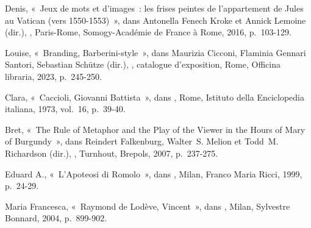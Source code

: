 \begin{teiElement}[name={TEI},change={commons\_edition}]
\begin{teiElement}[name={text},type={book},xmlid={book}]
\begin{teiElement}[name={group},type={book},xmlid={book-001}]
\begin{teiElement}[name={group},type={bibliography},data-page-title={Sources et bibliographie},data-include-href={Ch14\_Source\_bibliographie.xml},xmlid={bibliography-001}]
\begin{teiElement}[name={body}]
\begin{teiDiv}[type={section1},xmlid={div18}]
\begin{teiDiv}[type={section2},xmlid={div19}]
\begin{teiBibl}[xmlid={bibl-407}]
 Denis, « Jeux de mots et d’images : les frises peintes de l’appartement de Jules  au Vatican (vers 1550-1553) », dans Antonella Fenech Kroke et Annick Lemoine (dir.), , Paris-Rome, Somogy-Académie de France à Rome, 2016, p. 103-129.
\end{teiBibl}
              \begin{teiBibl}[xmlid={bibl-408}]
 Louise, « Branding, Barberini-style », dans Maurizia Cicconi, Flaminia Gennari Santori, Sebastian Schütze (dir.), , catalogue d’exposition, Rome, Officina libraria, 2023, p. 245-250.
\end{teiBibl}
              \begin{teiBibl}[xmlid={bibl-409}]
 Clara, « Caccioli, Giovanni Battista », dans , Rome, Istituto della Enciclopedia italiana, 1973, vol. 16, p. 39-40.
\end{teiBibl}
              \begin{teiBibl}[xmlid={bibl-410}]
 Bret, « The Rule of Metaphor and the Play of the Viewer in the Hours of Mary of Burgundy », dans Reindert Falkenburg, Walter S. Melion et Todd M. Richardson (dir.), , Turnhout, Brepols, 2007, p. 237-275.
\end{teiBibl}
              \begin{teiBibl}[xmlid={bibl-411}]
 Eduard A., « L’Apoteosi di Romolo », dans , Milan, Franco Maria Ricci, 1999, p. 24-29. 
\end{teiBibl}
              \begin{teiBibl}[xmlid={bibl-412}]
 Maria Francesca, « Raymond de Lodève, Vincent », dans , Milan, Sylvestre Bonnard, 2004, p. 899-902.
\end{teiBibl}
              \begin{teiBibl}[xmlid={bibl-413}]

\end{teiBibl}
\end{teiDiv}
\end{teiDiv}
\end{teiElement}
\end{teiElement}
\end{teiElement}
\end{teiElement}
\end{teiElement}
